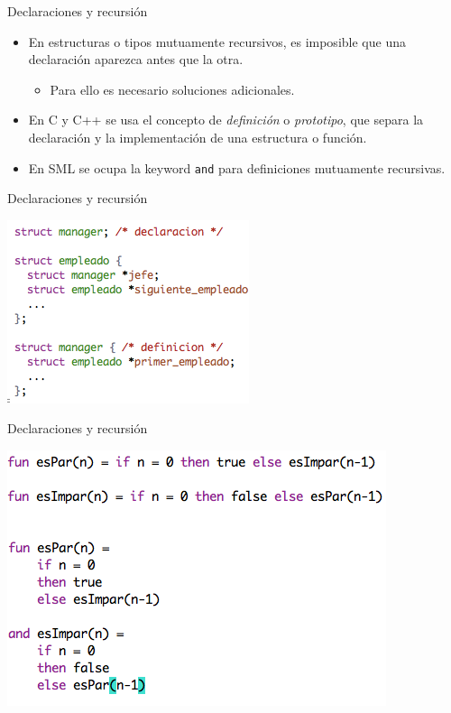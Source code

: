 \documentclass{beamer} %
\begin{document}
\begin{frame}{Declaraciones y recursión}
    \begin{itemize}
        \item En estructuras o tipos mutuamente recursivos, es imposible que una declaración aparezca antes que la otra.
        \begin{itemize}
            \item Para ello es necesario soluciones adicionales.
        \end{itemize}
        \item En C y C++ se usa el concepto de {\em definición} o {\em prototipo}, que separa la declaración y la implementación de una estructura o función.
        \item En SML se ocupa la keyword \texttt{and} para definiciones mutuamente recursivas.
    \end{itemize}
\end{frame}

\begin{frame}{Declaraciones y recursión}
    \begin{center}
        \includegraphics[width=.6\textwidth]{./image/cap5/scope-C-recursivo}
    \end{center}
\end{frame}

\begin{frame}{Declaraciones y recursión}
    \begin{center}
        \includegraphics[width=.7\textwidth]{./image/cap5/scope-SML-recursivo}
    \end{center}
\end{frame}
\end{document}
